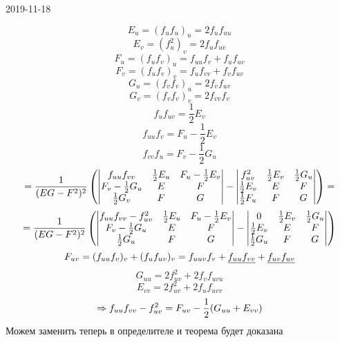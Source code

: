 \documentclass[main]{subfiles}
\begin{document}
\begin{lect}{2019-11-18}
\begin{Proof}
      \[E_u = (f_u f_u)_u = 2 f_u f_{uu}\]
      \[E_v = (f_u^2)_v = 2 f_u f_{uv}\]
      \[F_u = (f_u f_v)_u = f_{uu}f_v + f_u f_{uv}\]
      \[F_v = (f_u f_v)_v = f_u f_{vv} + f_v f_{uv}\]
      \[G_u = (f_v f_v)_u = 2 f_v f_{uv}\]
      \[G_v = (f_v f_v)_v = 2 f_{vv} f_v\]
      \[f_u f_{uv} = \frac{1}{2} E_v\]
      \[f_{uu} f_v = F_u - \frac{1}{2} E_v\]
      \[f_{vv} f_u = F_v - \frac{1}{2} G_u\]
      \[ = \frac{1}{(EG - F^2)^2} \left(\begin{vmatrix}
          f_{uu} f_{vv} & \frac{1}{2} E_u & F_u - \frac{1}{2} E_v\\
          F_v - \frac{1}{2} G_u & E & F\\
          \frac{1}{2} G_v & F & G
        \end{vmatrix} - \begin{vmatrix}
            f_{uv}^2 & \frac{1}{2}E_v & \frac{1}{2} G_u\\
            \frac{1}{2}E_v & E & F\\
            \frac{1}{2}F_u & F & G
          \end{vmatrix}\right) =
      \]
      \[ = \frac{1}{(EG - F^2)^2} \left(\begin{vmatrix}
          f_{uu} f_{vv} - f_{uv}^2 & \frac{1}{2} E_u & F_u - \frac{1}{2} E_v\\
          F_v - \frac{1}{2} G_u & E & F\\
          \frac{1}{2} G_u & F & G
        \end{vmatrix} - \begin{vmatrix}
          0 & \frac{1}{2}E_v & \frac{1}{2} G_u\\
          \frac{1}{2}E_v & E & F\\
          \frac{1}{2}G_u & F & G
        \end{vmatrix}\right)
      \]
      \[F_{uv} = (f_{uu} f_v)_v + (f_u f_{uv})_v = f_{uuv} f_v + \underline{f_{uu}f_{vv}} + \underline{f_{uv}f_{uv}}\]
      \[G_{uu} = 2 f_{uv}^2 + 2 f_v f_{uvu}\]
      \[E_{vv} = 2 f_{uv}^2 + 2 f_u f_{uvv}\]
      \[\Rightarrow f_{uu} f_{vv} - f^2_{uv} = F_{uv} - \frac{1}{2}(G_{uu}+E_{vv})\]
      Можем заменить теперь в определителе и теорема будет доказана
    \end{Proof}
    \end{lect}
\end{document}
